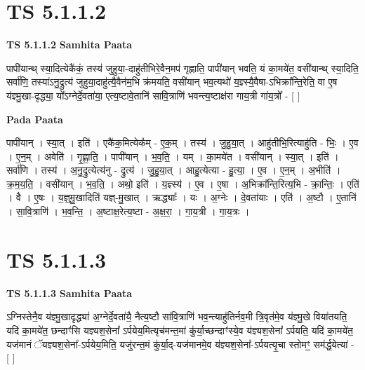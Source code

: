 \documentclass[17pt]{extarticle}
\begin{document}
\section*{ TS 5.1.1.2 }

\textbf{TS 5.1.1.2 } \newline
\textbf{Samhita Paata} \newline

पापी॑यान्थ् स्या॒दित्येकै॑कं॒ तस्य॑ जुहुया॒-दाहु॑तीभिरे॒वैन॒मप॑ गृह्णाति॒ पापी॑यान् भवति॒ यं का॒मये॑त॒ वसी॑यान्थ् स्या॒दिति॒ सर्वा॑णि॒ तस्या॑ऽनु॒द्रुत्य॑ जुहुया॒दाहु॑त्यै॒वैन॑म॒भि क्र॑मयति॒ वसी॑यान् भव॒त्यथो॑ य॒ज्ञ्स्यै॒वैषा-ऽभिक्रा᳚न्ति॒रेति॒ वा ए॒ष य॑ज्ञ्मु॒खा-दृद्ध्या॒ यो᳚ऽग्नेर्दे॒वता॑या॒ एत्य॒ष्टावे॒तानि॑ सावि॒त्राणि॑ भवन्त्य॒ष्टाक्ष॑रा गाय॒त्री गा॑य॒त्रो᳚ - [  ] \newline

\textbf{Pada Paata} \newline

पापी॑यान् । स्या॒त् । इति॑ । एकै॑क॒मित्येक᳚म् - ए॒क॒म् । तस्य॑ । जु॒हु॒या॒त् । आहु॑तीभि॒रित्याहु॑ति - भिः॒ । ए॒व । ए॒न॒म् । अवेति॑ । गृ॒ह्णा॒ति॒ । पापी॑यान् । भ॒व॒ति॒ । यम् । का॒मये॑त । वसी॑यान् । स्या॒त् । इति॑ । सर्वा॑णि । तस्य॑ । अ॒नु॒द्रुत्येत्य॑नु - द्रुत्य॑ । जु॒हु॒या॒त् । आहु॒त्येत्या - हु॒त्या॒ । ए॒व । ए॒न॒म् । अ॒भीति॑ । क्र॒म॒य॒ति॒ । वसी॑यान् । भ॒व॒ति॒ । अथो॒ इति॑ । य॒ज्ञ्स्य॑ । ए॒व । ए॒षा । अ॒भिक्रा᳚न्ति॒रित्य॒भि -  क्रा॒न्तिः॒ । एति॑ । वै । ए॒षः । य॒ज्ञ्॒मु॒खादिति॑ यज्ञ्-मु॒खात् । ऋद्ध्याः᳚ । यः । अ॒ग्नेः । दे॒वता॑याः । एति॑ । अ॒ष्टौ । ए॒तानि॑ । सा॒वि॒त्राणि॑ । भ॒व॒न्ति॒ । अ॒ष्टाक्ष॒रेत्य॒ष्टा - अ॒क्ष॒रा॒ । गा॒य॒त्री । गा॒य॒त्रः ।  \newline




\section*{ TS 5.1.1.3 }

\textbf{TS 5.1.1.3 } \newline
\textbf{Samhita Paata} \newline

ऽग्निस्तेनै॒व य॑ज्ञ्मु॒खादृद्ध्या॑ अ॒ग्नेर्दे॒वता॑यै॒ नैत्य॒ष्टौ सा॑वि॒त्राणि॑ भव॒न्त्याहु॑तिर्नव॒मी त्रि॒वृत॑मे॒व य॑ज्ञ्मु॒खे विया॑तयति॒ यदि॑ का॒मये॑त॒ छन्दाꣳ॑सि यज्ञ्यश॒सेना᳚ ऽर्पयेय॒मित्यृच॑मन्त॒मां कु॑र्या॒च्छन्दाꣳ॑स्ये॒व य॑ज्ञ्यश॒सेना᳚ ऽर्पयति॒ यदि॑ का॒मये॑त॒ यज॑मानं ॅयज्ञ्यश॒सेना᳚-ऽर्पयेय॒मिति॒ यजु॑रन्त॒मं कु॑र्या॒द्-यज॑मानमे॒व य॑ज्ञ्यश॒सेना᳚-ऽर्पयत्यृ॒चा स्तोमꣳ॒॒ सम॑र्द्ध॒येत्या॑ - [  ] \newline
\end{document}
